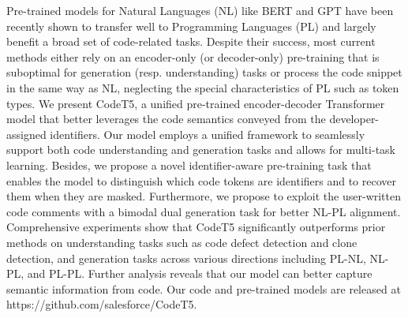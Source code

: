 Pre-trained models for Natural Languages (NL) like BERT and GPT have been recently shown to transfer well to Programming Languages (PL) and largely benefit a broad set of code-related tasks. Despite their success, most current methods either rely on an encoder-only (or decoder-only) pre-training that is suboptimal for generation (resp. understanding) tasks or process the code snippet in the same way as NL, neglecting the special characteristics of PL such as token types. We present CodeT5, a unified pre-trained encoder-decoder Transformer model that better leverages the code semantics conveyed from the developer-assigned identifiers. Our model employs a unified framework to seamlessly support both code understanding and generation tasks and allows for multi-task learning. Besides, we propose a novel identifier-aware pre-training task that enables the model to distinguish which code tokens are identifiers and to recover them when they are masked. Furthermore, we propose to exploit the user-written code comments with a bimodal dual generation task for better NL-PL alignment. Comprehensive experiments show that CodeT5 significantly outperforms prior methods on understanding tasks such as code defect detection and clone detection, and generation tasks across various directions including PL-NL, NL-PL, and PL-PL. Further analysis reveals that our model can better capture semantic information from code.  Our code and pre-trained models are released at https://github.com/salesforce/CodeT5.
